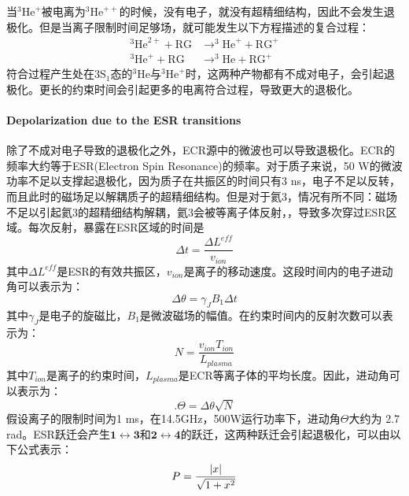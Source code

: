 \documentclass{article}
\numberwithin{equation}{subsection} %
\numberwithin{figure}{subsection} %
\numberwithin{table}{subsection} %
\begin{document}
当$^{3}\mathrm{He}^{+}$被电离为$^{3}\mathrm{He}^{++}$的时候，没有电子，就没有超精细结构，因此不会发生退极化。但是当离子限制时间足够场，就可能发生以下方程描述的复合过程：
\begin{align}
^3\text{He}^{2+} + \text{RG} &\rightarrow ^3\text{He}^+ + \text{RG}^+ \\
^3\text{He}^+ + \text{RG} &\rightarrow ^3\text{He} + \text{RG}^+
\label{eq:de-ionization_process}
\end{align}
符合过程产生处在$3\text{S}_1$态的$^{3}\mathrm{He}$与$^{3}\mathrm{He}^{+}$时，这两种产物都有不成对电子，会引起退极化。更长的约束时间会引起更多的电离符合过程，导致更大的退极化。 

\paragraph{Depolarization due to the ESR transitions}
除了不成对电子导致的退极化之外，ECR源中的微波也可以导致退极化。ECR的频率大约等于ESR(Electron Spin Resonance)的频率。对于质子来说，50 W的微波功率不足以支撑起退极化，因为质子在共振区的时间只有3 ns，电子不足以反转，而且此时的磁场足以解耦质子的超精细结构。但是对于氦3，情况有所不同：磁场不足以引起氦3的超精细结构解耦，氦3会被等离子体反射，，导致多次穿过ESR区域。每次反射，暴露在ESR区域的时间是
\begin{equation}
    \Delta t  = \frac{\Delta L^{eff}}{v_{ion}}
    \label{eq:time_exposed_in_ESR_region}
\end{equation}
其中$\Delta L^{eff}$是ESR的有效共振区，$v_{ion}$是离子的移动速度。这段时间内的电子进动角可以表示为：
\begin{equation}
    \Delta \theta = \gamma_J B_1  \Delta t
    \label{eq:electron_rotation_angle}
\end{equation}
其中$\gamma_J$是电子的旋磁比，$B_1$是微波磁场的幅值。在约束时间内的反射次数可以表示为：
\begin{equation}
    N = \frac{v_{ion} T_{ion}}{L_{plasma}}
    \label{eq:number_of_reflections}
\end{equation}
其中$T_{ion}$是离子的约束时间，$L_{plasma}$是ECR等离子体的平均长度。因此，进动角可以表示为：
\begin{equation}.
    \Theta = \Delta \theta \sqrt{N}
    \label{eq:electron_rotation_angle_with_number_of_reflections}
\end{equation}
假设离子的限制时间为1 ms，在14.5GHz，500W运行功率下，进动角$\Theta$大约为 2.7 rad。ESR跃迁会产生$\mathbf{1} \leftrightarrow \mathbf{3}$和$\mathbf{2} \leftrightarrow \mathbf{4}$的跃迁，这两种跃迁会引起退极化，可以由以下公式表示：
\begin{equation}
    P =\frac{\abs{x}}{\sqrt{1+x^2}}
    \label{eq:depolarization_due_to_ESR_transitions}
\end{equation}
\end{document}
